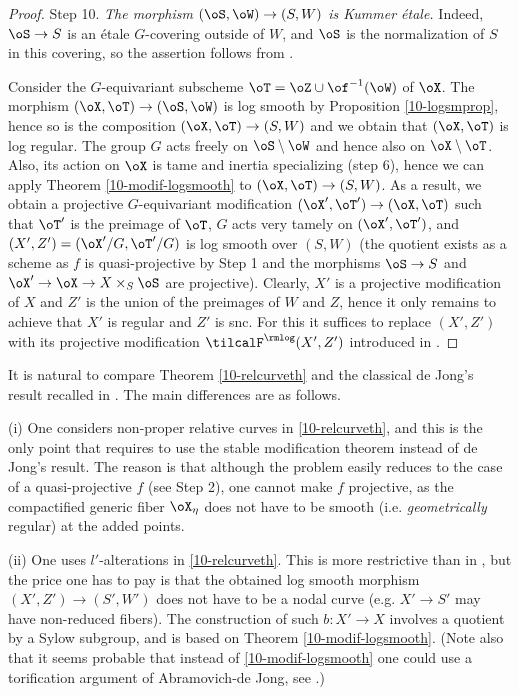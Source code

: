 \documentclass[10pt]{../fichiers-configuration-latex/smfart}
\begin{document}
\begin{proof}
Step 10. {\it The morphism $(\oS,\oW)\to(S,W)$ is Kummer étale.} Indeed, $\oS\to S$ is
an étale $G$-covering outside of $W$, and $\oS$ is the normalization of $S$ in this
covering, so the assertion follows from .

Consider the $G$-equivariant subscheme $\oT=\oZ\cup\of^{-1}(\oW)$ of $\oX$. The morphism
$(\oX,\oT)\to(\oS,\oW)$ is log smooth by Proposition \ref{10-logsmprop}, hence so is the
composition $(\oX,\oT)\to(S,W)$ and we obtain that $(\oX,\oT)$ is log regular. The group
$G$ acts freely on $\oS\setminus\oW$ and hence also on $\oX\setminus\oT$. Also, its action
on $\oX$ is tame and inertia specializing (step 6), hence we can apply Theorem \ref{10-modif-logsmooth}
to $(\oX,\oT)\to(S,W)$. As a result, we obtain a projective $G$-equivariant modification
$(\oX',\oT')\to(\oX,\oT)$ such that $\oT'$ is the preimage of $\oT$, $G$ acts very tamely
on $(\oX',\oT')$, and $(X',Z')=(\oX'/G,\oT'/G)$ is log smooth over $(S,W)$ (the quotient
exists as a scheme as $f$ is quasi-projective by Step 1 and the morphisms $\oS\to S$ and
$\oX'\to\oX\to X\times_S\oS$ are projective). Clearly, $X'$ is a projective modification
of $X$ and $Z'$ is the union of the preimages of $W$ and $Z$, hence it only remains to
achieve that $X'$ is regular and $Z'$ is snc. For this it suffices to replace $(X',Z')$
with its projective modification $\tilcalF^\rmlog(X',Z')$ introduced in  .
\end{proof}

\begin{remark2}
It is natural to compare Theorem \ref{10-relcurveth} and the classical de Jong's result
recalled in . The main differences are as follows.

(i) One considers non-proper relative curves in \ref{10-relcurveth}, and this is the only
point that requires to use the stable modification theorem instead of de Jong's result.
The reason is that although the problem easily reduces to the case of a quasi-projective
$f$ (see Step 2), one cannot make $f$ projective, as the compactified generic fiber
$\oX_\eta$ does not have to be smooth (i.e. {\em geometrically} regular) at the added points.

(ii) One uses $l'$-alterations in \ref{10-relcurveth}. This is more restrictive than
in , but the price one has to pay is that the obtained log smooth
morphism $(X',Z')\to(S',W')$ does not have to be a nodal curve (e.g. $X'\to S'$ may
have non-reduced fibers). The construction of such $b{\colon}X'\to X$ involves a
quotient by a Sylow subgroup, and is based on Theorem \ref{10-modif-logsmooth}.
(Note also that it seems probable that instead of \ref{10-modif-logsmooth} one
could use a torification argument of Abramovich-de Jong, see \cite[\S1.4.2]{AdJ@Resolution}.)
\end{remark2}
\end{document}
